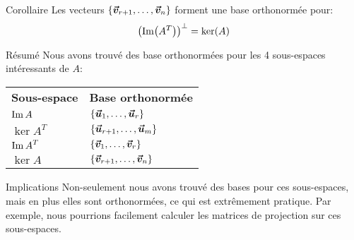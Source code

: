 \documentclass[a4paper]{article}
\begin{document}
\begin{parag}{Corollaire}
    Les vecteurs $\left\{\bvec{v}_{r+1}, \ldots, \bvec{v}_n\right\}$ forment une base orthonormée pour: 
    \[\left(\im\left(A^T\right)\right)^\perp = \ker\left(A\right)\]
\end{parag}

\begin{parag}{Résumé}
    Nous avons trouvé des base orthonormées pour les 4 sous-espaces intéressants de $A$:
    \begin{center}
    \begin{tabular}{ll}
        \textbf{Sous-espace} & \textbf{Base orthonormée}  \\
        $\displaystyle \operatorname{Im} A$ & $\displaystyle \left\{\bvec{u}_1, \ldots, \bvec{u}_r\right\}$ \\
        $\displaystyle \ker A^T$ & $\displaystyle \left\{\bvec{u}_{r+1}, \ldots, \bvec{u}_m\right\}$  \\
        $\displaystyle \operatorname{Im} A^T$ & $\displaystyle \left\{\bvec{v}_1, \ldots, \bvec{v}_r\right\}$  \\
        $\displaystyle \ker A$ & $\displaystyle \left\{\bvec{v}_{r+1}, \ldots, \bvec{v}_n\right\}$ \\
    \end{tabular}
    \end{center}
\end{parag}

\begin{parag}{Implications}
    Non-seulement nous avons trouvé des bases pour ces sous-espaces, mais en plus elles sont orthonormées, ce qui est extrêmement pratique. Par exemple, nous pourrions facilement calculer les matrices de projection sur ces sous-espaces.
\end{parag}
\end{document}
